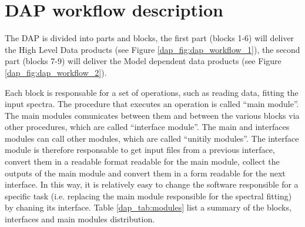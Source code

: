 \section{DAP workflow description}
\label{dap_sec:dap_workflow}

The DAP is divided into parts and blocks, the first part (blocks 1-6)
will deliver the High Level Data products (see Figure
\ref{dap_fig:dap_workflow_1}), the second part (blocks 7-9) will
deliver the Model dependent data products (see Figure
\ref{dap_fig:dap_workflow_2}). 

Each block is responsable for a set of operations, such as reading
data, fitting the input spectra. The procedure that executes an
operation is called ``main module''. The main modules comunicates
between them and between the various blocks via other procedures,
which are called ``interface module''. The main and interfaces modules
can call other modules, which are called ``unitily modules''. The
interface module is therefore responsable to get input files from a
previous interface, convert them in a readable format readable for the
main module, collect the outputs of the main module and convert them
in a form readable for the next interface. In this way, it is
relatively easy to change the software responsible for a specific task
(i.e. replacing the main module responsible for the spectral fitting)
by chaning its interface.  Table \ref{dap_tab:modules} list a summary
of the blocks, interfaces and main modules distribution.


